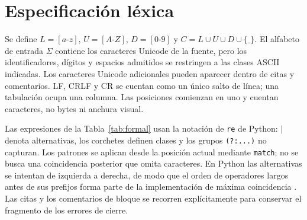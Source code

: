 \section{Especificación léxica}

Se define $L=[a\text{-}z]$, $U=[A\text{-}Z]$, $D=[0\text{-}9]$ y $C=L\cup U\cup D\cup\{\_\}$. El alfabeto de entrada $\Sigma$ contiene los caracteres Unicode de la fuente, pero los identificadores, dígitos y espacios admitidos se restringen a las clases ASCII indicadas. Los caracteres Unicode adicionales pueden aparecer dentro de citas y comentarios. LF, CRLF y CR se cuentan como un único salto de línea; una tabulación ocupa una columna. Las posiciones comienzan en uno y cuentan caracteres, no bytes ni anchura visual.

Las expresiones de la Tabla~\ref{tab:formal} usan la notación de \texttt{re} de Python: $|$ denota alternativas, los corchetes definen clases y los grupos \texttt{(?:...)} no capturan. Los patrones se aplican desde la posición actual mediante \texttt{match}; no se busca una coincidencia posterior que omita caracteres. En Python las alternativas se intentan de izquierda a derecha, de modo que el orden de operadores largos antes de sus prefijos forma parte de la implementación de máxima coincidencia \cite{pythonre}. Las citas y los comentarios de bloque se recorren explícitamente para conservar el fragmento de los errores de cierre.

